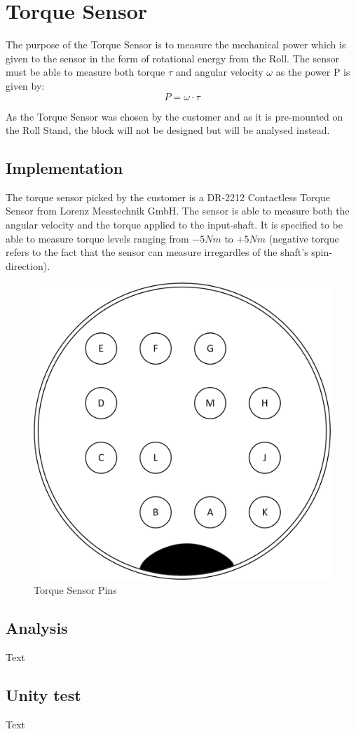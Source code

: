 \section{Torque Sensor}
The purpose of the Torque Sensor is to measure the mechanical power which is given to the sensor in the form of rotational energy from the Roll. The sensor must be able to measure both torque $\tau$ and angular velocity $\omega$ as the power P is given by:
\begin{equation}
	P=\omega\cdot\tau
\end{equation}

As the Torque Sensor was chosen by the customer and as it is pre-mounted on the Roll Stand, the block will not be designed but will be analysed instead.

\subsection{Implementation}
The torque sensor picked by the customer is a DR-2212 Contactless Torque Sensor from Lorenz Messtechnik GmbH. The sensor is able to measure both the angular velocity and the torque applied to the input-shaft. 
It is specified to be able to measure torque levels ranging from $-5 Nm$ to $+5 Nm$ (negative torque refers to the fact that the sensor can measure irregardles of the shaft's spin-direction).

\begin{figure}[H]
	\centering
	\includegraphics[width=0.3\linewidth]{Hardware/Pictures/Torque_Sensor_Pins}
	\caption{Torque Sensor Pins}
	\label{fig:Torque_pins}
\end{figure}

\subsection{Analysis}
Text

\subsection{Unity test}
Text